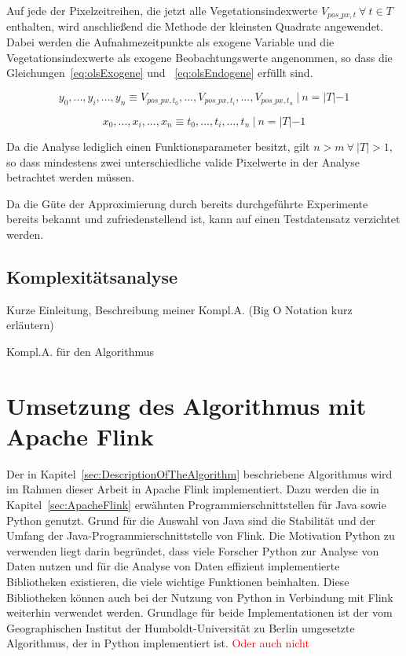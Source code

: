 Auf jede der Pixelzeitreihen, die jetzt alle Vegetationsindexwerte $V_{pos\_px, t}\ \forall\ t \in T$ enthalten, wird anschließend die Methode der kleinsten Quadrate angewendet. Dabei werden die Aufnahmezeitpunkte als exogene Variable  und die  Vegetationsindexwerte als exogene Beobachtungswerte angenommen, so dass die Gleichungen~\ref{eq:olsExogene} und ~\ref{eq:olsEndogene} erfüllt sind.

\begin{equation} \label{eq:olsExogene}
y_0, ..., y_i, ..., y_n \equiv V_{pos\_px, t_0}, ..., V_{pos\_px, t_i}, ..., V_{pos\_px, t_n}\ |\ n = |T| -1
\end{equation}

\begin{equation} \label{eq:olsEndogene}
x_0, ..., x_i,...,x_n \equiv t_0, ..., t_i, ..., t_n\ |\ n = |T| -1
\end{equation}

Da die Analyse lediglich einen Funktionsparameter besitzt, gilt $n > m\ \forall\ |T| > 1$, so dass mindestens zwei unterschiedliche valide Pixelwerte in der Analyse betrachtet werden müssen.

Da die Güte der Approximierung durch bereits durchgeführte Experimente bereits bekannt und zufriedenstellend ist, kann auf einen Testdatensatz verzichtet werden.

\subsection{Komplexitätsanalyse}
\label{sec:ComplexityAnalysis}
Kurze Einleitung, Beschreibung meiner Kompl.A. (Big O Notation kurz erläutern)

Kompl.A. für den Algorithmus

\section{Umsetzung des Algorithmus mit Apache Flink}
\label{sec:ImplementationFlinkDescription}
Der in Kapitel~\ref{sec:DescriptionOfTheAlgorithm} beschriebene Algorithmus wird im Rahmen dieser Arbeit in Apache Flink implementiert. Dazu werden die in Kapitel~\ref{sec:ApacheFlink} erwähnten Programmierschnittstellen für Java sowie Python genutzt. Grund für die Auswahl von Java sind die Stabilität und der Umfang der Java-Programmierschnittstelle von Flink. Die Motivation Python zu verwenden liegt darin begründet, dass viele Forscher Python zur Analyse von Daten nutzen und für die Analyse von Daten effizient implementierte Bibliotheken existieren, die viele wichtige Funktionen beinhalten. Diese Bibliotheken können auch bei der Nutzung von Python in Verbindung mit Flink weiterhin verwendet werden. Grundlage für beide Implementationen ist der vom Geographischen Institut der Humboldt-Universität zu Berlin umgesetzte Algorithmus, der in Python implementiert ist. \textcolor{red}{Oder auch nicht}

